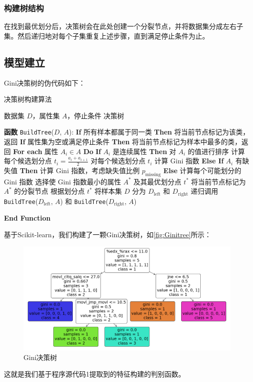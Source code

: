 \subsubsection*{构建树结构}
在找到最优划分后，决策树会在此处创建一个分裂节点，并将数据集分成左右子集。然后递归地对每个子集重复上述步骤，直到满足停止条件为止。
\vspace*{1cm}

\subsection{模型建立}
Gini决策树的伪代码如下：
\begin{breakablealgorithm}
	\caption{决策树构建算法}
	\label{alg:decision_tree}
	\begin{algorithmic}
		\REQUIRE 数据集 $D$，属性集 $A$，停止条件
		\ENSURE 决策树

		\STATE \textbf{函数} \texttt{BuildTree}($D$, $A$):
		\STATE \quad \textbf{If} 所有样本都属于同一类 \textbf{Then}
		\STATE \quad \quad 将当前节点标记为该类，返回
		\STATE \quad \textbf{If} 属性集为空或满足停止条件 \textbf{Then}
		\STATE \quad \quad 将当前节点标记为样本中最多的类，返回
		\STATE \quad \textbf{For each} 属性 $A_i \in A$ \textbf{Do}
		\STATE \quad \quad \textbf{If} $A_i$ 是连续属性 \textbf{Then}
		\STATE \quad \quad \quad 对 $A_i$ 的值进行排序
		\STATE \quad \quad \quad 计算每个候选划分点 $t_i = \frac{a_i + a_{i+1}}{2}$
		\STATE \quad \quad \quad 对每个候选划分点 $t_i$ 计算 Gini 指数
		\STATE \quad \quad \textbf{Else If} $A_i$ 有缺失值 \textbf{Then}
		\STATE \quad \quad \quad 计算 Gini 指数，考虑缺失值比例 $p_{\text{missing}}$
		\STATE \quad \quad \textbf{Else}
		\STATE \quad \quad \quad 计算每个可能划分的 Gini 指数
		\STATE \quad 选择使 Gini 指数最小的属性 $A^*$ 及其最优划分点 $t^*$
		\STATE \quad 将当前节点标记为 $A^*$ 的分裂节点
		\STATE \quad 根据划分点 $t^*$ 将样本集 $D$ 分为 $D_{\text{left}}$ 和 $D_{\text{right}}$
		\STATE \quad 递归调用 \texttt{BuildTree}($D_{\text{left}}$, $A$) 和 \texttt{BuildTree}($D_{\text{right}}$, $A$)

		\STATE \textbf{End Function}
	\end{algorithmic}
\end{breakablealgorithm}
基于Scikit-learn\cite{scikit-learn}，我们构建了一颗Gini决策树，如\autoref{fig:Ginitree}所示：
\begin{figure}[H]
	\centering
	\includegraphics[width=1\linewidth]{figures/Ginitree.png}
	\caption{Gini决策树}
	\label{fig:Ginitree}
\end{figure}
这就是我们基于程序源代码1提取到的特征构建的判别函数。
\vspace*{1cm}
